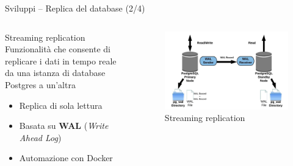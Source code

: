 \begin{frame}{Sviluppi – Replica del database (2/4)}

\begin{columns}

\begin{column}{0.45\textwidth}
\begin{block}{Streaming replication}
Funzionalità che consente di replicare i dati in tempo reale da una istanza di database Postgres a un’altra

\begin{itemize}
  \item Replica di sola lettura
  \item Basata su \textbf{WAL} (\textit{Write Ahead Log})
  \item Automazione con Docker\vspace{0.1cm}
\end{itemize}
\end{block}
\end{column}

\begin{column}{0.55\textwidth}
\begin{figure}[H]
\centering
\captionsetup{justification=centering}
\includegraphics[width=\textwidth]{images/streaming_replication}
\caption{Streaming replication}
\end{figure}
\end{column}

\end{columns}

\end{frame}


